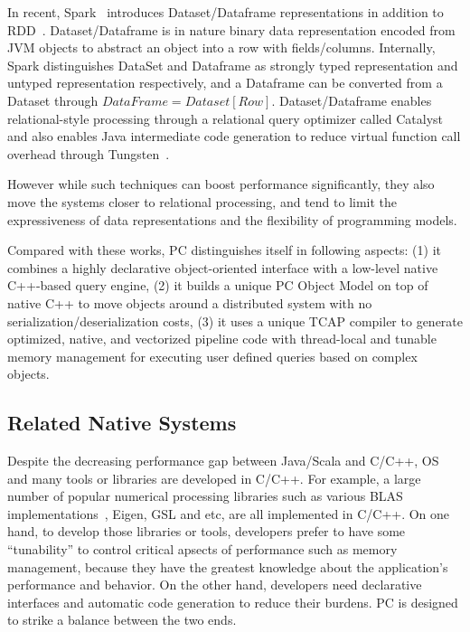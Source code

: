 In recent, Spark~\cite{tungsten} introduces Dataset/Dataframe representations
in addition to RDD~\cite{zaharia2012resilient}. Dataset/Dataframe is
in nature binary data representation encoded from JVM objects to
abstract an object  into a row with fields/columns. Internally,
Spark distinguishes DataSet and Dataframe as strongly typed representation and
untyped representation respectively, and a Dataframe can be
converted from a Dataset through $ DataFrame =
Dataset[Row] $. Dataset/Dataframe enables relational-style processing
through a relational query optimizer called Catalyst and
also enables Java intermediate code generation to reduce virtual
function call overhead through Tungsten~\cite{tungsten}. 

However while
such techniques can boost performance significantly, they also move the
systems closer to relational processing, and tend to limit the
expressiveness of data representations and the flexibility of
programming models.


\vspace{5pt}
Compared with these works, 
PC distinguishes itself in following aspects:
(1) it combines a highly declarative object-oriented interface with a
low-level native
C++-based query engine, (2) it builds a unique PC Object Model on top of
native C++ to move objects around a distributed system with no
serialization/deserialization costs, (3) it uses a unique TCAP
compiler to generate optimized, native, and vectorized
pipeline code with thread-local and tunable memory management for executing
user defined queries based on complex objects.

\subsection {Related Native Systems}
Despite the decreasing performance gap between Java/Scala and C/C++,
OS and many tools or libraries are developed in C/C++. For example,
a large number of popular numerical processing libraries such as
various BLAS implementations~\cite{barrachina2008evaluation}, Eigen, GSL
and etc, are all implemented in C/C++. 
On one hand, to
develop those libraries or tools, developers prefer to have some ``tunability'' to control critical apsects of performance such as
memory management, because they have the greatest knowledge about the
application's performance and behavior. On the other hand,
developers need declarative interfaces and automatic code generation
to reduce their burdens. PC is designed to strike a balance between
the two ends. 

